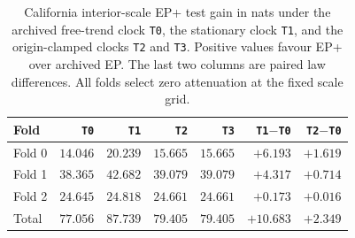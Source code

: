 \begin{table}[htbp]\centering\small
\begin{tabular}{@{}lrrrrrr@{}}\toprule
Fold & \texttt{T0} & \texttt{T1} & \texttt{T2} & \texttt{T3} & \texttt{T1}$-$\texttt{T0} & \texttt{T2}$-$\texttt{T0}\\\midrule
Fold 0 & $14.046$ & $20.239$ & $15.665$ & $15.665$ & $+6.193$ & $+1.619$\\
Fold 1 & $38.365$ & $42.682$ & $39.079$ & $39.079$ & $+4.317$ & $+0.714$\\
Fold 2 & $24.645$ & $24.818$ & $24.661$ & $24.661$ & $+0.173$ & $+0.016$\\\midrule
Total & $77.056$ & $87.739$ & $79.405$ & $79.405$ & $+10.683$ & $+2.349$\\
\bottomrule\end{tabular}
\caption{California interior-scale EP+ test gain in nats under the archived free-trend clock \texttt{T0}, the stationary clock \texttt{T1}, and the origin-clamped clocks \texttt{T2} and \texttt{T3}. Positive values favour EP+ over archived EP. The last two columns are paired law differences. All folds select zero attenuation at the fixed scale grid.}
\label{tab:pathway2-california}
\end{table}

